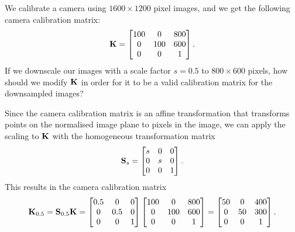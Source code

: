 \begin{example}[frametitle=Camera calibration matrix for downsampled images]
We calibrate a camera using $1600 \times 1200$ pixel images, and we get the following camera calibration matrix:
\begin{equation}
  {\boldsymbol{\mathbf{K}}} =
  \begin{bmatrix}
    100 &   0 & 800\\
      0 & 100 & 600\\
      0 &   0 &   1
  \end{bmatrix}.
\end{equation}
If we downscale our images with a scale factor $s = 0.5$ to $800 \times 600$ pixels, how should we modify ${\boldsymbol{\mathbf{K}}}$ in order for it to be a valid calibration matrix for the downsampled images?

Since the camera calibration matrix is an affine transformation that transforms points on the normalised image plane to pixels in the image, we can apply the scaling to ${\boldsymbol{\mathbf{K}}}$ with the homogeneous transformation matrix
\begin{equation}
    {\boldsymbol{\mathbf{S}}}_s = 
  \begin{bmatrix}
    s & 0 & 0\\
    0 & s & 0\\
    0 & 0 & 1
  \end{bmatrix}.
\end{equation}
This results in the camera calibration matrix
\begin{equation}
  {\boldsymbol{\mathbf{K}}}_{0.5} = {\boldsymbol{\mathbf{S}}}_{0.5} {\boldsymbol{\mathbf{K}}} = 
    \begin{bmatrix}
    0.5 & 0 & 0\\
    0 & 0.5 & 0\\
    0 & 0 & 1
  \end{bmatrix}
  \begin{bmatrix}
    100 &   0 & 800\\
      0 & 100 & 600\\
      0 &   0 &   1
  \end{bmatrix}
  =
  \begin{bmatrix}
    50 &   0 & 400\\
      0 & 50 & 300\\
      0 &   0 &   1
  \end{bmatrix}.
\end{equation}
\end{example}

